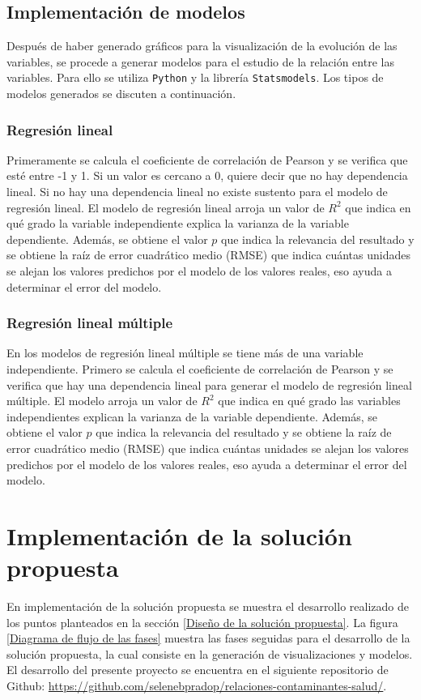 \clearpage
\subsection{Implementación de modelos}
Después de haber generado gráficos para la visualización de la evolución de las variables, se procede a generar modelos para el estudio de la relación entre las variables. Para ello se utiliza \texttt{Python} y la librería \texttt{Statsmodels}. Los tipos de modelos generados se discuten a continuación.

\subsubsection{Regresión lineal}
Primeramente se calcula el coeficiente de correlación de Pearson y se verifica que esté entre -1 y 1. Si un valor es cercano a 0, quiere decir que no hay dependencia lineal. Si no hay una dependencia lineal no existe sustento para el modelo de regresión lineal. El modelo de regresión lineal arroja un valor de $R^2$ que indica en qué grado la variable independiente explica la varianza de la variable dependiente. Además, se obtiene el valor $p$ que indica la relevancia del resultado y se obtiene la raíz de error cuadrático medio (RMSE) que indica cuántas unidades se alejan los valores predichos por el modelo de los valores reales, eso ayuda a determinar el error del modelo.

\subsubsection{Regresión lineal múltiple}
En los modelos de regresión lineal múltiple se tiene más de una variable independiente. Primero se calcula el coeficiente de correlación de Pearson y se verifica que hay una dependencia lineal para generar el modelo de regresión lineal múltiple. El modelo arroja un valor de $R^2$ que indica en qué grado las variables independientes explican la varianza de la variable dependiente. Además, se obtiene el valor $p$ que indica la relevancia del resultado y se obtiene la raíz de error cuadrático medio (RMSE) que indica cuántas unidades se alejan los valores predichos por el modelo de los valores reales, eso ayuda a determinar el error del modelo.

\section{Implementación de la solución propuesta}
En implementación de la solución propuesta se muestra el desarrollo realizado de los puntos planteados en la sección \ref{Diseño de la solución propuesta}. La figura \ref{Diagrama de flujo de las fases} muestra las fases seguidas para el desarrollo de la solución propuesta, la cual consiste en la generación de visualizaciones y modelos. El desarrollo del presente proyecto se encuentra en el siguiente repositorio de Github: \url{https://github.com/selenebpradop/relaciones-contaminantes-salud/}.

